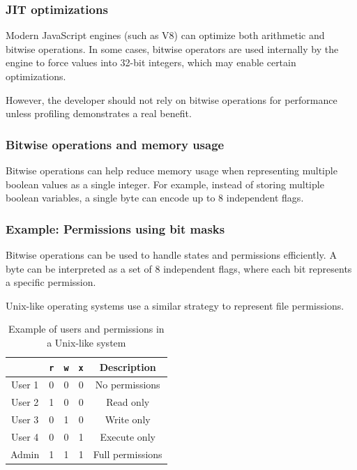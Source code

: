 \documentclass{scrbook}
\begin{document}
\subsubsection{JIT optimizations}

Modern JavaScript engines (such as V8) can optimize both arithmetic and bitwise operations. In some cases, bitwise operators are used internally by the engine to force values into 32-bit integers, which may enable certain optimizations.

However, the developer should not rely on bitwise operations for performance unless profiling demonstrates a real benefit.

\subsubsection{Bitwise operations and memory usage}

Bitwise operations can help reduce memory usage when representing multiple boolean values as a single integer. For example, instead of storing multiple boolean variables, a single byte can encode up to 8 independent flags.

\subsubsection{Example: Permissions using bit masks}

Bitwise operations can be used to handle states and permissions efficiently. A byte can be interpreted as a set of 8 independent flags, where each bit represents a specific permission.

Unix-like operating systems use a similar strategy to represent file permissions.

\begin{table}[h!]
    \centering
    \begin{tabular}{|c|c c c|c|}
        \hline
         & \texttt{r} & \texttt{w} & \texttt{x} & Description \\ \hline
         User 1 & 0 & 0 & 0 & No permissions \\ \hline
         User 2 & 1 & 0 & 0 & Read only \\ \hline
         User 3 & 0 & 1 & 0 & Write only \\ \hline
         User 4 & 0 & 0 & 1 & Execute only \\ \hline
         Admin & 1 & 1 & 1 & Full permissions \\ \hline
    \end{tabular}
    \caption{Example of users and permissions in a Unix-like system}
    \label{tab:user_permissions}
\end{table}
\end{document}
